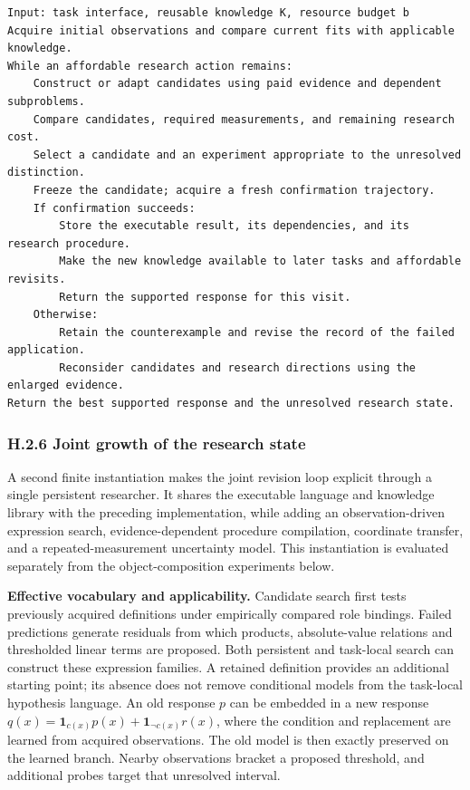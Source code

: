 \documentclass[11pt,a4paper]{article}
\begin{document}
\begin{Verbatim}[fontsize=\small,breaklines=true,breakanywhere=true]
Input: task interface, reusable knowledge K, resource budget b
Acquire initial observations and compare current fits with applicable knowledge.
While an affordable research action remains:
    Construct or adapt candidates using paid evidence and dependent subproblems.
    Compare candidates, required measurements, and remaining research cost.
    Select a candidate and an experiment appropriate to the unresolved distinction.
    Freeze the candidate; acquire a fresh confirmation trajectory.
    If confirmation succeeds:
        Store the executable result, its dependencies, and its research procedure.
        Make the new knowledge available to later tasks and affordable revisits.
        Return the supported response for this visit.
    Otherwise:
        Retain the counterexample and revise the record of the failed application.
        Reconsider candidates and research directions using the enlarged evidence.
Return the best supported response and the unresolved research state.
\end{Verbatim}

\subsubsection*{H.2.6 Joint growth of the research state}

A second finite instantiation makes the joint revision loop explicit through a
single persistent researcher. It shares the executable language and knowledge
library with the preceding implementation, while adding an observation-driven
expression search, evidence-dependent procedure compilation, coordinate transfer,
and a repeated-measurement uncertainty model. This instantiation is evaluated
separately from the object-composition experiments below.


\textbf{Effective vocabulary and applicability.} Candidate search first tests
previously acquired definitions under empirically compared role bindings. Failed
predictions generate residuals from which products, absolute-value relations and
thresholded linear terms are proposed. Both persistent and task-local search can
construct these expression families. A retained definition provides an additional
starting point; its absence does not remove conditional models from the
task-local hypothesis language. An old response \(p\) can be embedded in a new
response \(q(x)=\mathbf{1}_{c(x)}p(x)+\mathbf{1}_{\neg c(x)}r(x)\), where the
condition and replacement are learned from acquired observations. The old model
is then exactly preserved on the learned branch. Nearby observations bracket a
proposed threshold, and additional probes target that unresolved interval.
\end{document}
